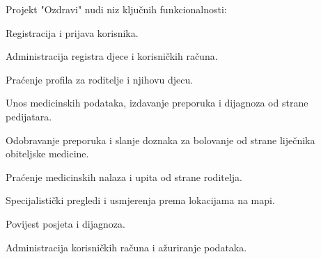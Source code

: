 Projekt "Ozdravi" nudi niz ključnih funkcionalnosti:
\begin{packed_item}
    \item Registracija i prijava korisnika.
    \item Administracija registra djece i korisničkih računa.
    \item Praćenje profila za roditelje i njihovu djecu.
    \item Unos medicinskih podataka, izdavanje preporuka i dijagnoza od strane pedijatara.
    \item Odobravanje preporuka i slanje doznaka za bolovanje od strane liječnika obiteljske medicine.
    \item Praćenje medicinskih nalaza i upita od strane roditelja.
    \item Specijalistički pregledi i usmjerenja prema lokacijama na mapi.
    \item Povijest posjeta i dijagnoza.
    \item Administracija korisničkih računa i ažuriranje podataka.
\end{packed_item}

